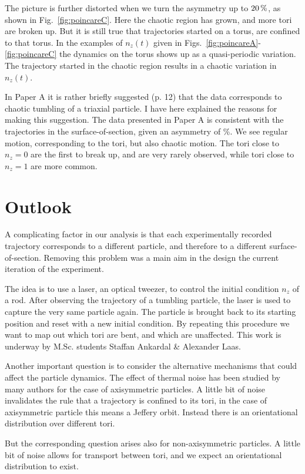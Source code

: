 \documentclass[thesis.tex]{subfiles}
\begin{document}
The picture is further distorted when we turn the asymmetry up to $\unit[20]{\%}$, as shown in Fig.~\ref{fig:poincareC}. Here the chaotic region has grown, and more tori are broken up. But it is still true that trajectories started on a torus, are confined to that torus. In the examples of $n_z(t)$ given in Figs.~\ref{fig:poincareA}-\ref{fig:poincareC} the dynamics on the torus shows up as a quasi-periodic variation. The trajectory started in the chaotic region results in a chaotic variation in $n_z(t)$.

In Paper A it is rather briefly suggested (p. 12) that the data corresponds to chaotic tumbling of a triaxial particle. I have here explained the reasons for making this suggestion. The data presented in Paper A is consistent with the trajectories in the surface-of-section, given an asymmetry of \unit[10-30]{\%}. We see regular motion, corresponding to the tori, but also chaotic motion. The tori close to $n_z=0$ are the first to break up, and are very rarely observed, while tori close to $n_z=1$ are more common. 


\section{Outlook}

A complicating factor in our analysis is that each experimentally recorded trajectory corresponds to a different particle, and therefore to a different surface-of-section. Removing this problem was a main aim in the design the current iteration of the experiment.

The idea is to use a laser, an optical tweezer, to control the initial condition $n_z$ of a rod. After observing the trajectory of a tumbling particle, the laser is used to capture the very same particle again. The particle is brought back to its starting position and reset with a new initial condition. By repeating this procedure we want to map out which tori are bent, and which are unaffected. This work is underway by M.Sc. students Staffan Ankardal \& Alexander Laas.

Another important question is to consider the alternative mechanisms that could affect the particle dynamics. The effect of thermal noise has been studied by many authors for the case of axisymmetric particles. A little bit of noise invalidates the rule that a trajectory is confined to its tori, in the case of axisymmetric particle this means a Jeffery orbit. Instead there is an orientational distribution over different tori.

But the corresponding question arises also for non-axisymmetric particles. A little bit of noise allows for transport between tori, and we expect an orientational distribution to exist.
\end{document}
